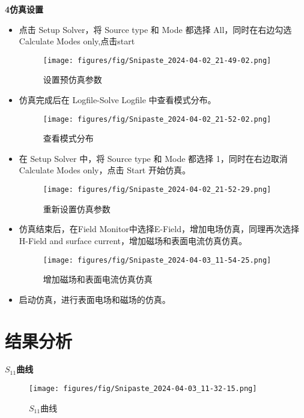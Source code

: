 \documentclass[12pt,hyperref,a4paper,UTF8]{ctexart}
\begin{document}
\textbf{4仿真设置}
\begin{itemize}
    \item 点击 Setup Solver，将 Source type 和 Mode 都选择 All，同时在右边勾选 Calculate Modes
    only,点击start
    \begin{figure}[H]
        \centering
        \texttt{[image: figures/fig/Snipaste\_2024-04-02\_21-49-02.png]}
        \caption{设置预仿真参数}
        \label{fig:enter-label}
    \end{figure}
    \item 仿真完成后在 Logfile-Solve Logfile 中查看模式分布。
    \begin{figure}[H]
        \centering
        \texttt{[image: figures/fig/Snipaste\_2024-04-02\_21-52-02.png]}
        \caption{查看模式分布}
        \label{fig:enter-label}
    \end{figure}
    \item 在 Setup Solver 中，将 Source type 和 Mode 都选择 1，同时在右边取消 Calculate Modes only，点击 Start 开始仿真。
    \begin{figure}[H]
        \centering
        \texttt{[image: figures/fig/Snipaste\_2024-04-02\_21-52-29.png]}
        \caption{重新设置仿真参数}
        \label{fig:enter-label}
    \end{figure}
    \item 仿真结束后，在Field Monitor中选择E-Field，增加电场仿真，同理再次选择H-Field and surface current，增加磁场和表面电流仿真仿真。
    \begin{figure}[H]
        \centering
        \texttt{[image: figures/fig/Snipaste\_2024-04-03\_11-54-25.png]}
        \caption{增加磁场和表面电流仿真仿真}
        \label{fig:enter-label}
    \end{figure}
    \item 启动仿真，进行表面电场和磁场的仿真。

\end{itemize}








\section{结果分析}

\textbf{$S_{11}$曲线}
\begin{figure}[H]
    \centering
    \texttt{[image: figures/fig/Snipaste\_2024-04-03\_11-32-15.png]}
    \caption{$S_{11}$曲线}
    \label{fig:enter-label}
\end{figure}
\end{document}
